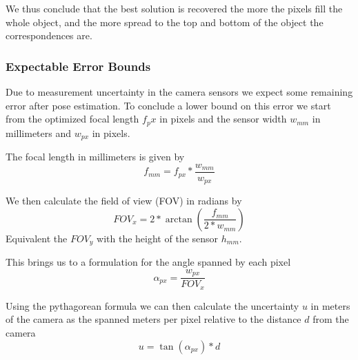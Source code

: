 We thus conclude that the best solution is recovered the more the pixels fill the whole object, and the more spread to the top and bottom of the object the correspondences are. 




























\subsubsection{Expectable Error Bounds}
\label{sec:static_calibration_expectable_error}

Due to measurement uncertainty in the camera sensors we expect some remaining error after pose estimation.
To conclude a lower bound on this error we start from the optimized focal length $f_px$ in pixels and the sensor width $w_{mm}$ in millimeters and $w_{px}$ in pixels.

The focal length in millimeters is given by 
\begin{equation}
  f_{mm} = f_{px} * \frac{w_{mm}}{w_{px}}
\end{equation}

We then calculate the field of view (FOV) in radians by 
\begin{equation}
  FOV_x = 2 * \arctan \left(\frac{f_{mm}}{2 * w_{mm}}\right)
\end{equation} 
Equivalent the $FOV_y$ with the height of the sensor $h_{mm}$.

This brings us to a formulation for the angle spanned by each pixel
\begin{equation}
  \alpha_{px} = \frac{w_{px}}{FOV_x}
\end{equation} 

Using the pythagorean formula we can then calculate the uncertainty $u$ in meters of the camera as the spanned meters per pixel relative to the distance $d$ from the camera 
\begin{equation}
  u = \tan (\alpha_{px}) * d
\end{equation}

